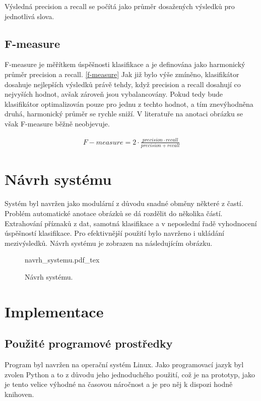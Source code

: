 \documentclass[czech,BP]{thesiskiv}
\begin{document}
\par Výsledná precision a recall se počítá jako průměr dosažených výsledků pro jednotlivá slova. 

\section{F-measure}
F-measure je měřítkem úspěšnosti klasifikace a je definována jako harmonický průměr precision a recall. \eqref{f-measure} Jak již bylo výše zmíněno, klasifikátor dosahuje nejlepších výsledků právě tehdy, když precision a recall dosahují co nejvyších hodnot, avšak zároveň jsou vybalancovány. Pokud tedy bude klasifikátor optimalizován pouze pro jednu z techto hodnot, a tím znevýhodněna druhá, harmonický průměr se rychle sniží. V literatuře na anotaci obrázku se však F-measure běžně neobjevuje.

\begin{align}
   \label{f-measure} F-measure = 2 \cdot \frac{precision \cdot recall}{precision + recall}
\end{align}


\chapter{Návrh systému}
Systém byl navržen jako modulární z důvodu snadné obměny některé z častí. Problém automatické anotace obrázků se dá rozdělit do několika částí. Extrahování příznaků z dat, samotná klasifikace a v neposlední řadě vyhodnocení úspěšností klasifikace. Pro efektivnější použití bylo navrženo i ukládání mezivýsledků. Návrh systému je zobrazen na následujícím obrázku.


\begin{figure}[ht]
    \centering
    \label{navrh_systemu}
    \def\svgwidth{\columnwidth}
    {navrh_systemu.pdf_tex} 
    \caption{Návrh systému.}
\end{figure}


\chapter{Implementace}
\section{Použité programové prostředky}
\par Program byl navržen na operační systém Linux. Jako programovací jazyk byl zvolen Python a to z důvodu jeho jednoduchého použití, což je na prototyp, jako je tento velice výhodné na časovou náročnost a je pro něj k dispozi hodně knihoven. 
\end{document}
